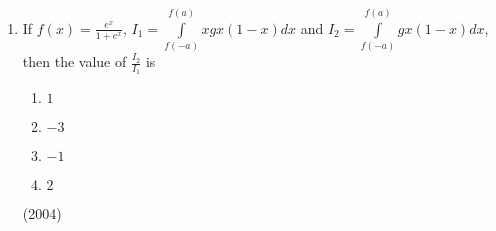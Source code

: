 \documentclass[journal,12pt,twocolumn]{IEEEtran}
\theoremstyle{remark}
\begin{document}
\begin{enumerate}[1.]
			\begin{enumerate}
				\item $2\pi$
				\item $\pi$
				\item $\frac{\pi}{4}$
				\item $0$
			\end{enumerate}
			\hfill (2004)
	\item
		If $f(x)= \frac{e^x}{1+e^x}, \, I_1=\int \limits_{f(-a)}^{f(a)}x g{x(1-x)}dx$ and $I_2 = \int \limits_{f(-a)}^{f(a)}g{x(1-x)}dx$, then the value of $\frac{I_2}{I_1}$ is 
			\begin{enumerate}
				\item $1$
				\item $-3$
				\item $-1$
				\item $2$
			\end{enumerate}
			\hfill (2004)
\end{enumerate}
\end{document}
